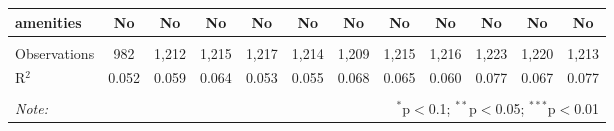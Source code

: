 \begin{table}[!htbp]
\begin{tabular}{@{\extracolsep{5pt}}lccccccccccc}
amenities & No & No & No & No & No & No & No & No & No & No & No \\ 
\hline \\[-1.8ex] 
Observations & 982 & 1,212 & 1,215 & 1,217 & 1,214 & 1,209 & 1,215 & 1,216 & 1,223 & 1,220 & 1,213 \\ 
R$^{2}$ & 0.052 & 0.059 & 0.064 & 0.053 & 0.055 & 0.068 & 0.065 & 0.060 & 0.077 & 0.067 & 0.077 \\ 
\hline 
\hline \\[-1.8ex] 
\textit{Note:}  & \multicolumn{11}{r}{$^{*}$p$<$0.1; $^{**}$p$<$0.05; $^{***}$p$<$0.01} \\ 
\end{tabular} 
\end{table} 
